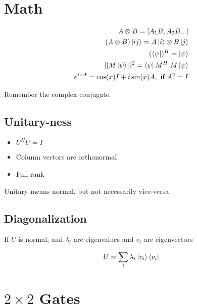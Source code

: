 \documentclass[twocolumn]{article}
\begin{document}
\section{Math}

\begin{eqnarray*}
A \otimes B = [A_1 B, A_2 B ... ] \\
(A \otimes B)\ket{ij} = A\ket{i} \otimes B\ket{j} \\
(\bra{\psi})^H = \ket{\psi} \\
|| M\ket{\psi} ||^2 = \bra{\psi} M^H | M \ket{\psi} \\
e^{i x A} = \cos(x) I + i \sin(x) A, \mbox{ if } A^2 = I \\
\end{eqnarray*}

Remember the complex conjugate.

\subsection{Unitary-ness}

\begin{itemize}
\item $U^H U = I$
\item Column vectors are orthonormal
\item Full rank
\end{itemize}

Unitary means normal, but not necessarily vice-versa

\subsection{Diagonalization}

If $U$ is normal, and $\lambda_i$ are eigenvalues and $v_i$ are eigenvectors

\begin{equation}
U = \sum_i \lambda_i \ket{v_i}\bra{v_i}
\end{equation}



\section{$2\times 2$ Gates}
\end{document}

